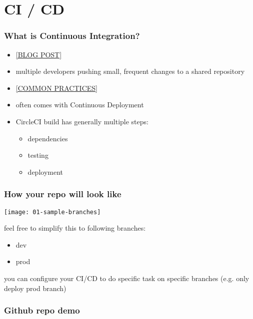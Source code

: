 \section{CI / CD}

\frame{\tableofcontents[currentsection]}

\begin{frame}
    \frametitle{What is Continuous Integration?}   
    \begin{itemize}
        \item \href{https://circleci.com/blog/what-is-continuous-integration/}{[BLOG POST]}
        \item multiple developers pushing small, frequent changes to a shared repository
        \item \href{https://en.wikipedia.org/wiki/Continuous_integration}{[COMMON PRACTICES]}
        \item often comes with Continuous Deployment
        \item CircleCI build has generally multiple steps:
        \begin{itemize}
            \item dependencies
            \item testing
            \item deployment
        \end{itemize}
    \end{itemize}
\end{frame}

\begin{frame}
    \frametitle{How your repo will look like}   
    \texttt{[image: 01-sample-branches]}
    
    feel free to simplify this to following branches:
    \begin{itemize}
        \item dev
        \item prod
    \end{itemize}
    you can configure your CI/CD to do specific task on specific branches (e.g. only deploy prod branch)
\end{frame}

\begin{frame}
    \frametitle{Github repo demo}   
\end{frame}

